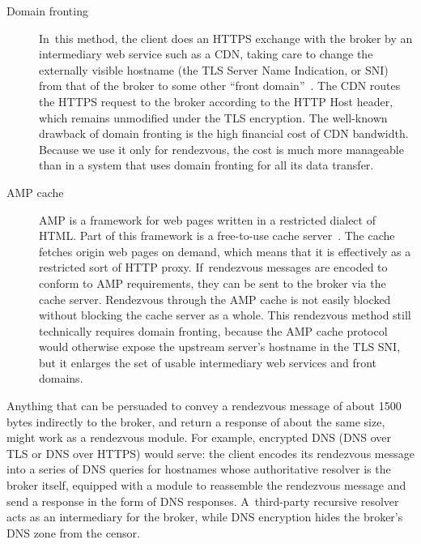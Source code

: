 \documentclass[letterpaper,twocolumn]{article}
\begin{document}
\begin{description}
\item[Domain fronting]
In~this method, the client does an HTTPS exchange with the broker
by an intermediary web service such as a CDN,
taking care to change the externally visible hostname
(the TLS Server Name Indication, or SNI)
from that of the broker to some other ``front domain''~\cite{Fifield2015a}.
The CDN routes the HTTPS request to the broker
according to the HTTP Host header, which remains unmodified
under the TLS encryption.
The well-known drawback of domain fronting
is the high financial cost of CDN bandwidth.
Because we use it only for rendezvous,
the cost is much more manageable than in a system
that uses domain fronting for all its data transfer.

\item[AMP cache]
AMP is a framework for web pages written in a restricted dialect of HTML.
Part of this framework is a free-to-use
cache server~\cite{amp-cache}.
The cache fetches origin web pages on demand,
which means that it is effectively as a restricted sort of HTTP proxy.
If~rendezvous messages are encoded to conform to AMP requirements,
they can be sent to the broker via the cache server.
Rendezvous through the AMP cache is not easily blocked
without blocking the cache server as a whole.
This rendezvous method still technically requires domain fronting,
because the AMP cache protocol would otherwise expose the
upstream server's hostname in the TLS SNI,
but it enlarges the set of usable intermediary web services and front domains.
\end{description}

Anything that can be persuaded to convey a rendezvous message
of about 1500 bytes indirectly to the broker,
and return a response of about the same size,
might work as a rendezvous module.
For example, encrypted DNS
(DNS over TLS or DNS over HTTPS) would serve:
the client encodes its rendezvous message into a series of DNS queries
for hostnames whose authoritative resolver is the broker itself,
equipped with a module to reassemble the rendezvous message
and send a response in the form of DNS responses.
A~third-party recursive resolver acts as an intermediary for the broker,
while DNS encryption hides the broker's DNS zone from the censor.
\end{document}
